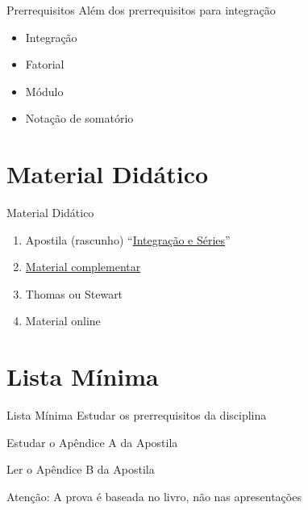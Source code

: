 \documentclass[fleqn,utf8,aspectratio=169,12pt]{beamer}
\begin{document}
\begin{frame}{Prerrequisitos}
  Além dos prerrequisitos para integração
  \begin{itemize}[<+->]
    \item Integração
    \item Fatorial
    \item Módulo
    \item Notação de somatório
  \end{itemize}
\end{frame}

\section{Material Didático}

\begin{frame}{Material Didático}
  \begin{enumerate}[<+->]
    \item Apostila (rascunho)  ``\href{https://sites.google.com/view/prof-luis-dafonseca/gradua\%C3\%A7\%C3\%A3o/Integrais-e-Series}{Integração e Séries}''
    \item \href{https://drive.google.com/drive/u/2/folders/1Bb1hqfdwt6E3jZpB8L4HRhbtW-UopeNB}{Material complementar}
    \item Thomas ou Stewart
    \item Material online
  \end{enumerate}
\end{frame}

\section{Lista Mínima}

\begin{frame}{Lista Mínima}
  Estudar os prerrequisitos da disciplina

  Estudar o Apêndice A da Apostila

  Ler o Apêndice B da Apostila

  \vfill
  Atenção: A prova é baseada no livro, não nas apresentações
\end{frame}

\end{document}
